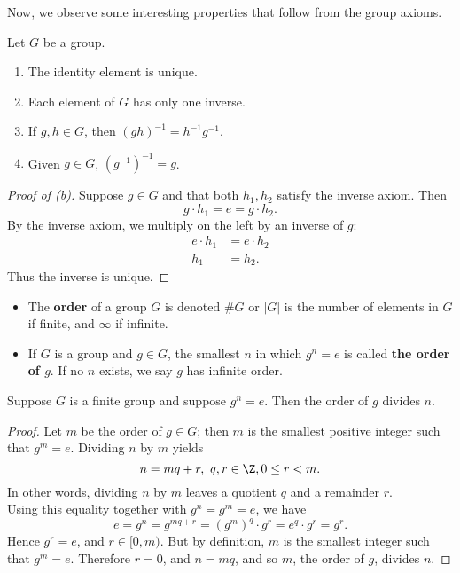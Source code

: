 \documentclass[math1530-lecture-notes]{subfiles}
\begin{document}
Now, we observe some interesting properties that follow from the group axioms.
\begin{proposition}{}
  Let $G$ be a group.
  \begin{enumerate}
    \item The identity element is unique.
    \item Each element of $G$ has only one inverse.
    \item If $g,h\in G$, then $(gh)^{-1}=h^{-1}g^{-1}$.
    \item Given $g\in G$, $(g^{-1})^{-1}=g$.
  \end{enumerate}
\end{proposition}
\begin{proof}[Proof of (b)]
  Suppose $g\in G$ and that both $h_1,h_2$ satisfy the inverse axiom. Then \[
  g\cdot h_1=e=g\cdot h_2
  .\]  By the inverse axiom, we multiply on the left by an inverse of $g $:
  \begin{align*}
    e\cdot h_1&= e\cdot h_2 \\
    h_1&=h_2
  .\end{align*} Thus the inverse is unique.
\end{proof}

\begin{definition}[Order]{}
  \begin{itemize}
    \item The \textbf{order} of a group $G$ is denoted  $\#G$ or  $\left| G \right| $ is the number of
          elements in $G$ if finite, and $\infty$ if infinite.
    \item If $G$ is a group and $g\in G$, the smallest $n$ in which $g^{n}=e$ is called \textbf{the
      order of $g$}. If no $n$ exists, we say $g$ has infinite order.
  \end{itemize}
\end{definition}

\begin{proposition}{}
  Suppose $G$ is a finite group and suppose $g^{n}=e$. Then the order of $g$ divides $n$.
\end{proposition}
\begin{proof}[Proof]
  Let $m$ be the order of $g\in G$; then $m$ is the smallest positive integer such that $g^{m}=e$.
  Dividing $n$ by $m$ yields \[
    n = mq+r,\ q,r\in \Z, 0\le r<m
  .\] In other words, dividing  $n$ by $m$ leaves a quotient $q$ and a remainder $r$.\\
  Using this equality together with $g^{n}=g^{m}=e$, we have \[
    e=g^{n}=g^{mq+r}=(g^{m})^{q}\cdot g^{r}=e^{q}\cdot g^{r}=g^{r}
  .\] Hence $g^{r}=e$, and $r\in [0,m)$. But by definition, $m$ is the smallest integer such that
  $g^{m}=e$. Therefore $r=0$, and $n=mq$, and so $m$, the order of $g$, divides $n$.
\end{proof}
\end{document}
